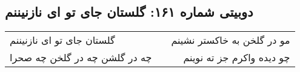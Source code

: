\begin{center}
\section*{دوبیتی شماره ۱۶۱: گلستان جای تو ای نازنیننم}
\label{sec:161}
\begin{longtable}{l p{0.5cm} r}
گلستان جای تو ای نازنیننم
&&
مو در گلخن به خاکستر نشینم
\\
چه در گلشن چه در گلخن چه صحرا
&&
چو دیده واکرم جز ته نوینم
\\
\end{longtable}
\end{center}
